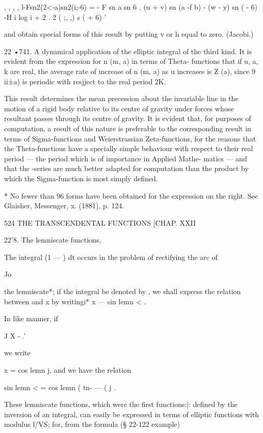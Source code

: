 , , , , l-Fsn2(2<-a)sn2(i;-6) 
= - F sn a sn 6 .  (u + v) sn (a -f b) - (w -  y) sn (  - 6)  -H i log i +  2 . 2 ( ;,  ,) s  (  + 6) ' 

and obtain special forms of this result by putting v or h equal to zero. (Jacobi.) 

22 •741. A dynamical application of the elliptic integral of the third kind. 
It is evident from the expression for n (m, a) in terms of Theta- functions that if u, a, k 
are real, the average rate of increase of n (m, a) as u increases is Z (a), since 9  ii±a) is 
periodic with resjject to the real period 2K. 

This result determines the mean precession about the invariable line in the motion of 
a rigid body relative to its centre of gravity under forces whose resultant passes through 
its centre of gravity. It is evident that, for purposes of computation, a result of this nature 
is preferable to the corresponding result in terms of Sigma-functions and Weierstrassian 
Zeta-functions, for the reasons that the Theta-functious have a specially simple behaviour 
with respect to their real period — the period which is of importance in Applied Mathe- 
matics — and that the  -series are much better adapted for computation than the product 
by which the Sigma-function is most simply defined. 

* No fewer than 96 forms have been obtained for the expression on the right. See Glaisher, 
Messenger, x. (1881), p. 124. 



524 THE TRANSCENDENTAL FUNCTIONS [CHAP. XXII 

22'8. The lemniscate functions. 

The integral (1 —  )   dt occurs in the problem of rectifying the arc of 

Jo 

the lemniscate*; if the integral be denoted by  , we shall express the 
relation between   and x by writingi* x — sin lemn < . 

In like manner, if 

J X -  .' 

we write 

x = cos lemn  j, 
and we have the relation 



sin lemn <  = cos lemn (   tn- — (  j . 



These lemniscate functions, which were the first functions:]: defined by the 
inversion of an integral, can easily be expressed in terms of elliptic functions 
with modulus l/VS; for, from the formula (§ 22-122 example) 

